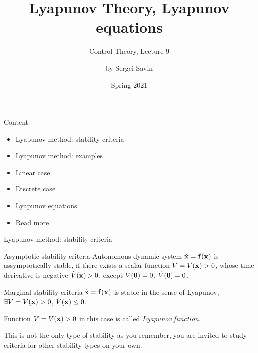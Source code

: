 \documentclass{beamer}
\title{Lyapunov Theory, Lyapunov equations}
\subtitle{Control Theory, Lecture 9}
\author{by Sergei Savin}
\date{Spring 2021}
\begin{document}
\maketitle


\begin{frame}{Content}

\begin{itemize}
\item Lyapunov method: stability criteria
\item Lyapunov method: examples
\item Linear case
\item Discrete case
\item Lyapunov equations
\item Read more
\end{itemize}

\end{frame}





\begin{frame}{Lyapunov method: stability criteria}
\begin{flushleft}

\begin{block}{Asymptotic stability criteria}
Autonomous dynamic system $\dot{\mathbf{x}} = \mathbf{f}(\mathbf{x})$ is assymptotically stable, if there exists a scalar function $V = V(\mathbf{x}) > 0$, whose time derivative is negative $\dot V(\mathbf{x}) > 0$, except $V(\mathbf{0}) = 0$, $\dot V(\mathbf{0}) = 0$.
\end{block}

\begin{block}{Marginal stability criteria}
$\dot{\mathbf{x}} = \mathbf{f}(\mathbf{x})$ is stable in the sense of Lyapunov, $\exists V = V(\mathbf{x}) > 0$, $\dot V(\mathbf{x}) \leq 0$.
\end{block}

\begin{definition}
Function $V = V(\mathbf{x}) > 0$ in this case is called \emph{Lyapunov function}.
\end{definition}

\bigskip

This is not the only type of stability as you remember, you are invited to study criteria for other stability types on your own.

\end{flushleft}
\end{frame}
\end{document}
